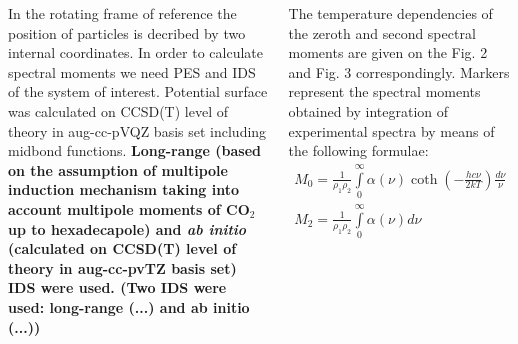 \documentclass[
  20pt,
  a0paper,
  portrait,
  margin=0mm,
  innermargin=15mm,
  blockverticalspace=0mm,
  colspace=0mm,
  subcolspace=0mm
]{tikzposter}
\newcommand{\lb}{\left(}
\newcommand{\rb}{\right)}
\newcommand{\vverh}{\vspace*{-0.05cm}}
\begin{document}
\begin{columns}
{{In the rotating frame of reference the position of particles is decribed by two internal coordinates. In order to calculate spectral moments we need PES and IDS of the system of interest. Potential surface was calculated on CCSD(T) level of theory in aug-cc-pVQZ basis set including midbond functions. \textbf{Long-range (based on the assumption of multipole induction mechanism taking into account multipole moments of CO$_2$ up to hexadecapole) and \textit{ab initio} (calculated on CCSD(T) level of theory in aug-cc-pvTZ basis set) IDS were used. (Two IDS were used: long-range (...) and ab initio (...))}\par
The temperature dependencies of the zeroth and second spectral moments are given on the Fig. 2 and Fig. 3 correspondingly. Markers represent the spectral moments obtained by integration of experimental spectra by means of the following formulae:
\vverh
\begin{gather}
		M_0 = \frac{1}{\rho_1 \rho_2} \int\limits_{0}^{\infty} \alpha(\nu) \coth \lb - \frac{h c \nu}{2 k T} \rb \frac{d \nu}{\nu} \label{eq:m0_spectra} \\
		M_2 = \frac{1}{\rho_1 \rho_2} \int\limits_{0}^{\infty} \alpha(\nu) d \nu \label{eq:m2_spectra}
\end{gather}

}}
\end{columns}
\end{document}
